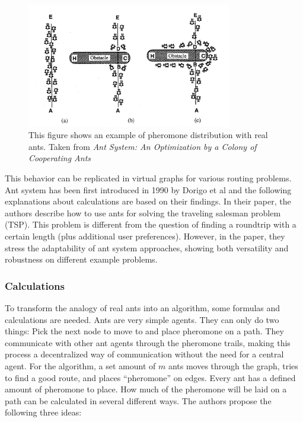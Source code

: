\begin{figure}[H]
	\begin{centering}
		\includegraphics[width=0.8\textwidth]{bilder/antSystemExampleIllustration.png}
		\caption{This figure shows an example of pheromone distribution with real ants. Taken from \textit{Ant System: An Optimization by a Colony of Cooperating Ants}\cite{dorigo_ant_1996}}
		\label{fig:antSystemExampleIllustration}
	\end{centering}
\end{figure}


This behavior can be replicated in virtual graphs for various routing problems.
Ant system has been first introduced in 1990 by Dorigo et al\cite{dorigo_ant_1996} and the following explanations about calculations are based on their findings.
In their paper, the authors describe how to use ants for solving the traveling salesman problem (TSP).
This problem is different from the question of finding a roundtrip with a certain length (plus additional user preferences).
However, in the paper, they stress the adaptability of ant system approaches, showing both versatility and robustness on different example problems.


\subsubsection{Calculations}
\label{subsubsec:antCalculations}

To transform the analogy of real ants into an algorithm, some formulas and calculations are needed.
Ants are very simple agents. 
They can only do two things:
Pick the next node to move to and place pheromone on a path.
They communicate with other ant agents through the pheromone trails, making this process a decentralized way of communication without the need for a central agent.
For the algorithm, a set amount of $m$ ants moves through the graph, tries to find a good route, and places \enquote{pheromone} on edges.
Every ant has a defined amount of pheromone to place. 
How much of the pheromone will be laid on a path can be calculated in several different ways. 
The authors propose the following three ideas:

